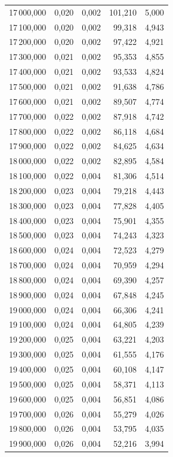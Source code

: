 \begin{longtable}{rrrrr}
17\,000,000 & 0,020 & 0,002 & 101,210 & 5,000\\
17\,100,000 & 0,020 & 0,002 & 99,318 & 4,943\\
17\,200,000 & 0,020 & 0,002 & 97,422 & 4,921\\
17\,300,000 & 0,021 & 0,002 & 95,353 & 4,855\\
17\,400,000 & 0,021 & 0,002 & 93,533 & 4,824\\
17\,500,000 & 0,021 & 0,002 & 91,638 & 4,786\\
17\,600,000 & 0,021 & 0,002 & 89,507 & 4,774\\
17\,700,000 & 0,022 & 0,002 & 87,918 & 4,742\\
17\,800,000 & 0,022 & 0,002 & 86,118 & 4,684\\
17\,900,000 & 0,022 & 0,002 & 84,625 & 4,634\\
18\,000,000 & 0,022 & 0,002 & 82,895 & 4,584\\
18\,100,000 & 0,022 & 0,004 & 81,306 & 4,514\\
18\,200,000 & 0,023 & 0,004 & 79,218 & 4,443\\
18\,300,000 & 0,023 & 0,004 & 77,828 & 4,405\\
18\,400,000 & 0,023 & 0,004 & 75,901 & 4,355\\
18\,500,000 & 0,023 & 0,004 & 74,243 & 4,323\\
18\,600,000 & 0,024 & 0,004 & 72,523 & 4,279\\
18\,700,000 & 0,024 & 0,004 & 70,959 & 4,294\\
18\,800,000 & 0,024 & 0,004 & 69,390 & 4,257\\
18\,900,000 & 0,024 & 0,004 & 67,848 & 4,245\\
19\,000,000 & 0,024 & 0,004 & 66,306 & 4,241\\
19\,100,000 & 0,024 & 0,004 & 64,805 & 4,239\\
19\,200,000 & 0,025 & 0,004 & 63,221 & 4,203\\
19\,300,000 & 0,025 & 0,004 & 61,555 & 4,176\\
19\,400,000 & 0,025 & 0,004 & 60,108 & 4,147\\
19\,500,000 & 0,025 & 0,004 & 58,371 & 4,113\\
19\,600,000 & 0,025 & 0,004 & 56,851 & 4,086\\
19\,700,000 & 0,026 & 0,004 & 55,279 & 4,026\\
19\,800,000 & 0,026 & 0,004 & 53,795 & 4,035\\
19\,900,000 & 0,026 & 0,004 & 52,216 & 3,994\\

\end{longtable}
